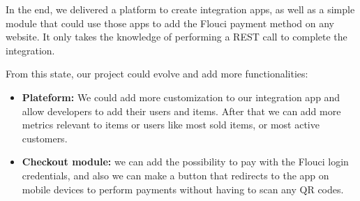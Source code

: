 \begin{spacing}{1.2}
In the end, we delivered a platform to create integration apps, as well as a simple module that could use those apps to add the Flouci payment method on any website. It only takes the knowledge of performing a REST call to complete the integration.

From this state, our project could evolve and add more functionalities:
\begin{itemize}
	\item \textbf{Plateform:} We could add more customization to our integration app and allow developers to add their users and items. After that we can add more metrics relevant to items or users like most sold items, or most active customers.
	\item \textbf{Checkout module:} we can add the possibility to pay with the Flouci login credentials, and also we can make a button that redirects to the app on mobile devices to perform payments without having to scan any QR codes.
\end{itemize} 

\end{spacing}